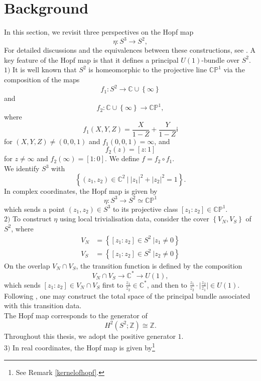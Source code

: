 \documentclass{article}
\theoremstyle{plain}
\theoremstyle{definition}
\begin{document}
\section{Background}
In this section, we revisit three perspectives on the Hopf map $$\eta:S^3 \longrightarrow S^2,$$
For detailed discussions and the equivalences between these constructions, see \cite[on page 15]{MR3012377}. A key feature of the Hopf map is that it defines a principal $U(1)$-bundle over $S^2$.\\
$1)$ It is well known that $S^2$ is homeomorphic to the projective line $\mathbb{CP}^1$ via the composition of the maps
\[
f_1:S^2 \longrightarrow \mathbb{C} \cup \left\{\infty\right\}
\]
and
\[
f_2:\mathbb{C} \cup \left\{\infty\right\} \longrightarrow \mathbb{CP}^1,
\]
where
\[
f_1(X,Y,Z) = \frac{X}{1-Z} + \frac{Y}{1-Z}\mathsf{i}
\]
for $(X,Y,Z) \neq (0,0,1)$ and $f_1(0,0,1)=\infty$, and
\[
f_2(z) = [z:1]
\]
for $z \neq \infty$ and $f_2(\infty) = [1:0]$. We define $f = f_2 \circ f_1$. \\
We identify $S^3$ with
\[
\left\{(z_1,z_2) \in \mathbb{C}^2 ~\big\vert~ \lvert z_1 \rvert^2 + \lvert z_2 \rvert^2=1\right\}.
\]
In complex coordinates, the Hopf map is given by
\[
\eta:S^3 \longrightarrow S^2 \simeq \mathbb{CP}^1
\]
which sends a point $(z_1,z_2) \in S^3$ to its projective class $[z_1:z_2] \in \mathbb{CP}^1$. \\
$2)$ To construct $\eta$ using local trivialisation data, consider the cover
$\left\{V_N,V_S\right\}$ of $S^2$, where
\begin{align*}
V_N & = \left\{[z_1:z_2] \in S^2 ~ \big\vert z_1 \neq 0\right\} \\
V_S & = \left\{[z_1:z_2] \in S^2 ~ \big\vert z_2 \neq 0\right\}
\end{align*}
On the overlap $V_N \cap V_S$, the transition function is defined by the composition
\[
V_N \cap V_S \longrightarrow \mathbb{C}^\ast \longrightarrow U(1),
\]
which sends $[z_1:z_2] \in V_N \cap V_S$ first to $\frac{z_1}{z_2} \in \mathbb{C}^\ast$, and then to $\frac{z_1}{z_2} \cdot \big\vert \frac{z_2}{z_1}\big\vert \in U(1)$. Following \cite[on page 583]{MR2805195}, one may construct the total space of the principal bundle associated with this transition data. \\
The Hopf map corresponds to the generator of
\[
H^2(S^2;\mathbb{Z}) \cong \mathbb{Z}.
\]
Throughout this thesis, we adopt the positive generator $1$. \\
$3)$ In real coordinates, the Hopf map is given by\footnote{See Remark \ref{kernelofhopf}.}
\end{document}

